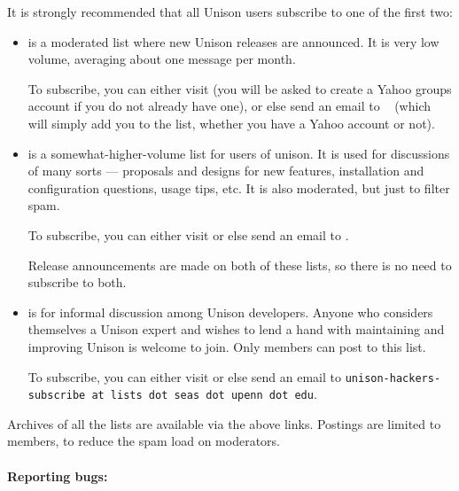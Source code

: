 It is strongly recommended that all Unison users subscribe to one of the
first two:  
\begin{itemize}
\item {\bf
  }
is a moderated list where new Unison releases are announced.  It is very
low volume, averaging about one message per month. 

To subscribe, you can either visit 
   (you will be
  asked to create a Yahoo groups account if you do not already have one),
  or else send an email to
  {\tt
  }
  (which will 
  simply add you to the list, whether you have a Yahoo account or not).

  \item {\bf
    } is a
  somewhat-higher-volume list for users of unison.  It is used for
  discussions of many sorts --- proposals and designs for new features,
  installation and configuration questions, usage tips, etc.  It is also
  moderated, but just to filter spam.

To subscribe, you can either visit 
  or else send an email to
  {\tt {}}.

Release announcements are made on both of these lists, so there is
no need to subscribe to both.

\item {\bf
  } is
for informal discussion among Unison developers.  Anyone who considers
themselves a Unison expert and wishes to lend a hand with maintaining and
improving Unison is welcome to join.  Only members can post to this list. 

To subscribe, you can either visit 
  or else send an email to
  {\tt unison-hackers-subscribe at lists dot seas dot upenn dot edu}.
\end{itemize}
Archives of all the lists are available via the
above links. Postings are limited to members, to reduce the spam load on moderators.

\paragraph{Reporting bugs:}

